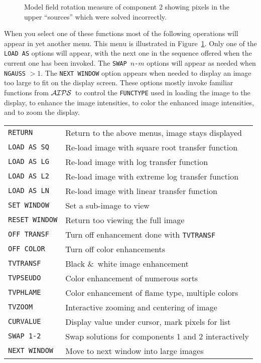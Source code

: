 \documentclass[twoside]{article}
\newcommand{\Me}[1]{\textcolor{mecol}{#1}}
\newcommand{\AIPS}{{$\cal AIPS\/$}}
\newcommand{\putfig}[1]{\texttt{[image: \#1.eps]}}
\begin{document}
\begin{figure}
\begin{center}
\resizebox{6.0in}{!}{\putfig{RMFIT.badpix}}
\caption{Model field rotation measure of component 2 showing pixels in
the upper ``sources'' which were solved incorrectly.}
\label{fig:RMFIT.badpix}
\end{center}
\end{figure}

When you select one of these functions most of the following
operations will appear in yet another menu.  This menu is illustrated
in Figure~\ref{fig:RMFIT.badpix}.  Only one of the {\tt LOAD AS}
options will appear, with the next one in the sequence offered when
the current one has been invoked.  The {\tt SWAP $n$-$m$} options will
appear as needed when {\tt NGAUSS} $ > 1$.  The {\tt NEXT WINDOW}
option appears when needed to display an image too large to fit on the
display screen.  These options mostly invoke familiar functions from
\AIPS\ to control the {\tt FUNCTYPE} used in loading the image to the
display, to enhance the image intensities, to color the enhanced image
intensities, and to zoom the display.

\begin{center}
\begin{tabular}{|l|l|}\hline
 {\tt RETURN     } & Return to the above menus, image stays displayed\\
 {\tt LOAD AS SQ } & Re-load image with square root transfer function\\
 {\tt LOAD AS LG } & Re-load image with log transfer function\\
 {\tt LOAD AS L2 } & Re-load image with extreme log transfer function\\
 {\tt LOAD AS LN } & Re-load image with linear transfer function\\
\Me{{\tt SET WINDOW}} & \Me{Set a sub-image to view}\\
\Me{{\tt RESET WINDOW}} & \Me{Return too viewing the full image}\\
 {\tt OFF TRANSF } & Turn off enhancement done with {\tt TVTRANSF}\\
 {\tt OFF COLOR  } & Turn off color enhancements\\
 {\tt TVTRANSF   } & Black \&\ white image enhancement\\
 {\tt TVPSEUDO   } & Color enhancement of numerous sorts\\
 {\tt TVPHLAME   } & Color enhancement of flame type, multiple colors\\
 {\tt TVZOOM     } & Interactive zooming and centering of image\\
 {\tt CURVALUE   } & Display value under cursor, mark pixels for list\\
 {\tt SWAP 1-2   } & Swap solutions for components 1 and 2 interactively\\
 {\tt NEXT WINDOW} & Move to next window into large images\\ \hline
\end{tabular}
\end{center}
\end{document}
